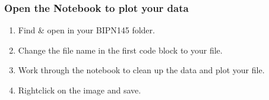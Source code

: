 \documentclass[letterpaper,10pt,english]{jupyterBook}
\begin{document}
\subsubsection{Open the Notebook to plot your data}
\label{\detokenize{EEG:open-the-notebook-to-plot-your-data}}\begin{enumerate}
%
\item {} 
\sphinxAtStartPar
Find \& open  in your BIPN145 folder.

\item {} 
\sphinxAtStartPar
Change the file name in the first code block to your file.

\item {} 
\sphinxAtStartPar
Work through the notebook to clean up the data and plot your file.

\item {} 
\sphinxAtStartPar
Right\sphinxhyphen{}click on the image and save.

\end{enumerate}







\renewcommand{\indexname}{Index}
\printindex
\end{document}
